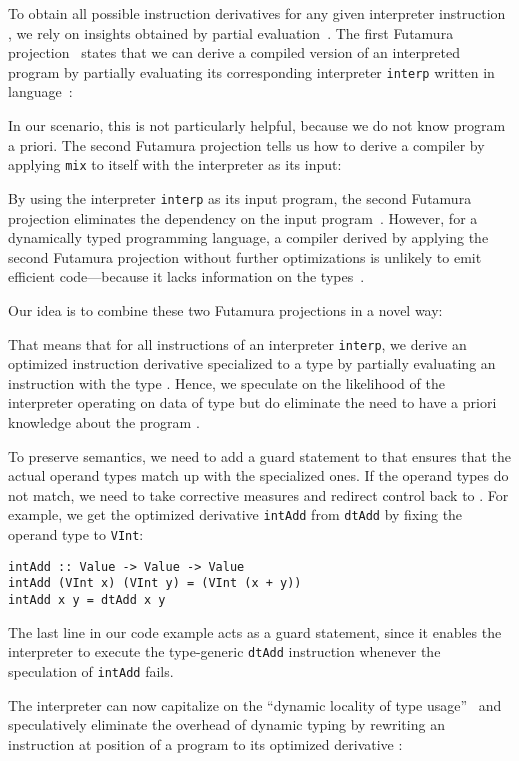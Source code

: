 \documentclass[preprint,10pt]{popl14conf}
\begin{document}
To obtain all possible instruction derivatives  for any given interpreter instruction , we
rely on insights obtained by partial evaluation~\cite{jones.etal+93}.
The first Futamura projection~\cite{futamura+71} states that we can derive a compiled version of an
interpreted program  by partially evaluating its corresponding interpreter \texttt{interp}
written in language~:

In our scenario, this is not particularly helpful, because we do not know program  a priori.
The second Futamura projection tells us how to derive a compiler by applying \texttt{mix} to itself
with the interpreter as its input:

By using the interpreter \texttt{interp} as its input program, the second Futamura projection
eliminates the dependency on the input program~.
However, for a dynamically typed programming language, a compiler derived by applying the second
Futamura projection without further optimizations is unlikely to emit efficient code---because it
lacks information on the types~\cite{thibault.etal+00}.

Our idea is to combine these two Futamura projections in a novel way:

That means that for all instructions  of an interpreter \texttt{interp}, we derive an optimized
instruction derivative  specialized to a type  by partially evaluating an instruction 
with the type .
Hence, we speculate on the likelihood of the interpreter operating on data of type  but do
eliminate the need to have a priori knowledge about the program .


To preserve semantics, we need to add a guard statement to  that ensures that the actual operand
types match up with the specialized ones.
If the operand types do not match, we need to take corrective measures and redirect control back to
.
For example, we get the optimized derivative \texttt{intAdd} from \texttt{dtAdd} by fixing the
operand type to \texttt{VInt}:

\begin{lstlisting}[style=prettyhaskell]
intAdd :: Value -> Value -> Value
intAdd (VInt x) (VInt y) = (VInt (x + y))
intAdd x y = dtAdd x y
\end{lstlisting}

The last line in our code example acts as a guard statement, since it enables the interpreter to
execute the type-generic \texttt{dtAdd} instruction whenever the speculation of \texttt{intAdd} fails.

The interpreter can now capitalize on the ``dynamic locality of type
usage''~\cite{deutsch.schiffman+84} and speculatively eliminate the overhead of dynamic typing by
rewriting an instruction  at position  of a program  to its optimized derivative :
\end{document}
